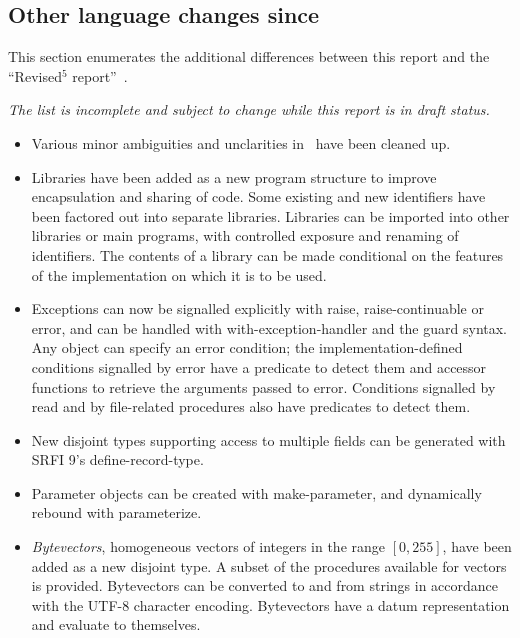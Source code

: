 \subsection*{Other language changes since \rfivers}
\label{differences}
This section enumerates the additional differences between this report and
the ``Revised$^5$ report''~\cite{R5RS}.

{\em The list is incomplete and subject to change while this report is in draft status.}


\begin{itemize}

\item Various minor ambiguities and unclarities in \rfivers\ have been cleaned up.

\item Libraries have been added as a new program structure to improve
encapsulation and sharing of code.  Some existing and new identifiers
have been factored out into separate libraries.
Libraries can be imported into other libraries or main programs, with
controlled exposure and renaming of identifiers.
The contents of a library can be made conditional on the features of
the implementation on which it is to be used.

\item Exceptions can now be signalled explicitly with {\cf raise},
{\cf raise-continuable} or {\cf error}, and can be handled with {\cf
with-exception-handler} and the {\cf guard} syntax.
Any object can specify an error condition; the implementation-defined
conditions signalled by {\cf error} have a predicate to detect them and accessor functions to
retrieve the arguments passed to {\cf error}.
Conditions signalled by {\cf read} and by file-related procedures
also have predicates to detect them.

\item New disjoint types supporting access to multiple fields can be
generated with SRFI 9's {\cf define-record-type}.

\item Parameter objects can be created with {\cf make-parameter}, and
dynamically rebound with {\cf parameterize}.

\item {\em Bytevectors}, homogeneous vectors of integers in the range
$[0, 255]$, have been added as a new disjoint type.
A subset of the procedures available for vectors is provided.  Bytevectors
can be converted to and from strings in accordance with the UTF-8 character encoding.
Bytevectors have a datum representation and evaluate to themselves.


\end{itemize}
